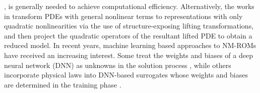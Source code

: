 \cite{astrid2008missing,barrault2004empirical,carlberg2013gnat,chaturantabut2010nonlinear,drmac2016new,grepl2007efficient,nguyen2008best}, is generally needed to achieve computational efficiency. Alternatively, the works in \cite{benner2015two,goyal2016algebraic,kramer2019nonlinear,kramer2019balanced} transform PDEs with general nonlinear terms to representations with only quadratic nonlinearities via the use of structure-exposing lifting transformations, and then project the quadratic operators of the resultant lifted PDE to obtain a reduced model. In recent years, machine learning based approaches to NM-ROMs have received an increasing interest. Some treat the weights and biases of a deep neural network (DNN) as unknowns in the solution process \cite{dissanayake1994neural,lagaris1998artificial,meade1994numerical,van1995neural}, while others incorporate physical laws into DNN-based surrogates whose weights and biases are determined in the training phase \cite{han2018solving,lu2019deeponet,lu2021deepxde,pang2019fpinns,raissi2019physics,lee2020model,lee2019deep}. 

